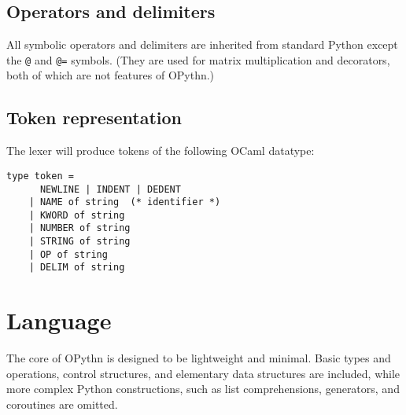 \documentclass[11pt, twoside]{article}
\newcommand{\ms}{\texttt}
\begin{document}
    \subsection{Operators and delimiters}
    All symbolic operators and delimiters are inherited from standard Python except the \ms{@} and \ms{@=} symbols. (They are used for matrix multiplication and decorators, both of which are not features of OPythn.)
    \subsection{Token representation}
    The lexer will produce tokens of the following OCaml datatype:
    \begin{lstlisting}[language=caml]
    type token =
      NEWLINE | INDENT | DEDENT
    | NAME of string  (* identifier *)
    | KWORD of string
    | NUMBER of string
    | STRING of string
    | OP of string
    | DELIM of string
    \end{lstlisting}

\section{Language}
    The core of OPythn is designed to be lightweight and minimal. Basic types and operations, control structures, and elementary data structures are included, while more complex Python constructions, such as list comprehensions, generators, and coroutines are omitted.
\end{document}
